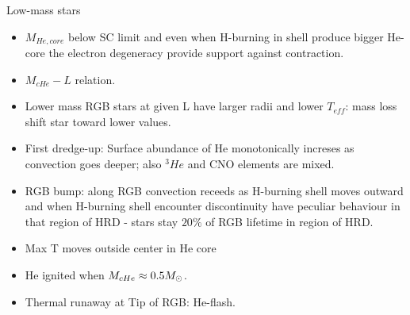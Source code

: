 \begin{frame}{Low-mass stars}
    \begin{itemize}
        \item $M_{He,core}$ below SC limit and even when H-burning in shell produce bigger He-core the electron degeneracy provide support against contraction.
        \item $M_{cHe}-L$ relation.
        \item Lower mass RGB stars at given L have larger radii and lower $T_{eff}$: mass loss shift star toward lower values.
        \item First dredge-up: Surface abundance of He monotonically increses as convection goes deeper; also $^3He$ and CNO elements are mixed.
        \item RGB bump: along RGB convection receeds as H-burning shell moves outward and when H-burning shell encounter discontinuity have peculiar behaviour in that region of HRD - stars stay $20\%$ of RGB lifetime in region of HRD.
        \item Max T moves outside center in He core
        \item He ignited when $M_{cHe}\approx0.5M_{\odot}{}$.
        \item Thermal runaway at Tip of RGB: He-flash.
    \end{itemize}
\end{frame}

